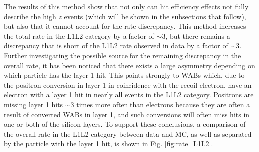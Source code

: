 The results of this method show that not only can hit efficiency effects not fully describe the high $z$ events (which will be shown in the subsections that follow), but also that it cannot account for the rate discrepancy. This method increases the total rate in the L1L2 category by a factor of $\sim$3, but there remains a discrepancy that is short of the L1L2 rate observed in data by a factor of $\sim$3. Further investigating the possible source for the remaining discrepancy in the overall rate, it has been noticed that there exists a large asymmetry depending on which particle has the layer 1 hit. This points strongly to WABs which, due to the positron conversion in layer 1 in coincidence with the recoil electron, have an electron with a layer 1 hit in nearly all events in the L1L2 category. Positrons are missing layer 1 hits $\sim$3 times more often than electrons because they are often a result of converted WABs in layer 1, and such conversions will often miss hits in one or both of the silicon layers. To support these conclusions, a comparison of the overall rate in the L1L2 category between data and MC, as well as separated by the particle with the layer 1 hit, is shown in Fig. \ref{fig:rate_L1L2}.

